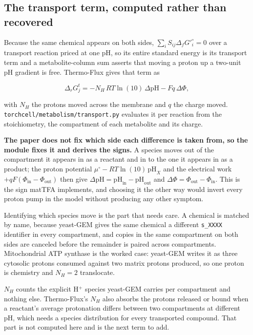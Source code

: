 \subsection{The transport term, computed rather than recovered}
\label{sec:transport-term}

Because the same chemical appears on both sides,
$\sum_i S_{ij}\Delta_f G'^\circ_i = 0$ over a transport reaction priced at one pH, so its
entire standard energy is its transport term and a metabolite-column sum asserts that moving
a proton up a two-unit pH gradient is free. Thermo-Flux gives that term as

\begin{equation}
  \Delta_r G^t_j = -N_H\,RT\ln(10)\,\Delta\mathrm{pH} - Fq\,\Delta\Phi ,
  \label{eq:transport}
\end{equation}

with $N_H$ the protons moved across the membrane and $q$ the charge moved.
\texttt{torchcell/metabolism/transport.py} evaluates it per reaction from the stoichiometry,
the compartment of each metabolite and its charge.

\textbf{The paper does not fix which side each difference is taken from, so the module fixes
it and derives the signs.} A species moves out of the compartment it appears in as a
reactant and in to the one it appears in as a product; the proton potential
$\mu^\circ - RT\ln(10)\,\mathrm{pH}_X$ and the electrical work
$+qF(\Phi_\mathrm{in} - \Phi_\mathrm{out})$ then give
$\Delta\mathrm{pH} = \mathrm{pH}_\mathrm{in} - \mathrm{pH}_\mathrm{out}$ and
$\Delta\Phi = \Phi_\mathrm{out} - \Phi_\mathrm{in}$. This is the sign matTFA implements, and
choosing it the other way would invert every proton pump in the model without producing any
other symptom.

Identifying which species move is the part that needs care. A chemical is matched by name,
because yeast-GEM gives the same chemical a different \texttt{s\_XXXX} identifier in every
compartment, and copies in the same compartment on both sides are canceled before the
remainder is paired across compartments. Mitochondrial ATP
synthase is the worked case: yeast-GEM writes it as three cytosolic protons consumed against
two matrix protons produced, so one proton is chemistry and $N_H = 2$ translocate.

$N_H$ counts the explicit H$^+$ species yeast-GEM carries per compartment and nothing else.
Thermo-Flux's $N_H$ also absorbs the protons released or bound when a reactant's average
protonation differs between two compartments at different pH, which needs a species
distribution for every transported compound. That part is not computed here and is the
next term to add.

